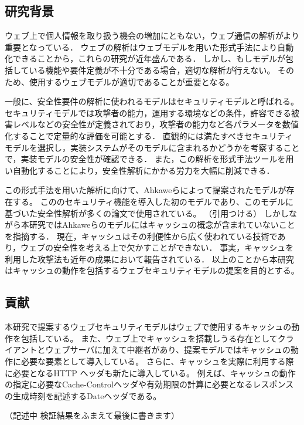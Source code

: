 \documentclass{css}
\begin{document}
\subsection{研究背景}
ウェブ上で個人情報を取り扱う機会の増加にともない，ウェブ通信の解析がより重要となっている．
\color{red}
ウェブの解析はウェブモデルを用いた形式手法により自動化できることから，これらの研究が近年盛んである．
\color{black}
しかし、もしモデルが包括している機能や要件定義が不十分である場合，適切な解析が行えない。
そのため、使用するウェブモデルが適切であることが重要となる。

一般に、安全性要件の解析に使われるモデルはセキュリティモデルと呼ばれる。
セキュリティモデルでは攻撃者の能力，運用する環境などの条件，許容できる被害レベルなどの安全性が定義されており，攻撃者の能力など各パラメータを数値化することで定量的な評価を可能とする．
直観的には満たすべきセキュリティモデルを選択し，実装システムがそのモデルに含まれるかどうかを考察することで，実装モデルの安全性が確認できる．
また，この解析を形式手法ツールを用い自動化することにより，安全性解析にかかる労力を大幅に削減できる．

\color{red}
この形式手法を用いた解析に向けて、Ahkaweらによって提案されたモデルが存在する\cite{webmodel}。
こののセキュリティ機能を導入した初のモデルであり、このモデルに基づいた安全性解析が多くの論文で使用されている。
\color{black}
\color{red}
（引用つける）
\color{black}
しかしながら本研究ではAhkaweらのモデルにはキャッシュの概念が含まれていないことを指摘する．
現在，キャッシュはその利便性から広く使われている技術であり，ウェブの安全性を考える上で欠かすことができない．
事実，キャッシュを利用した攻撃法も近年の成果において報告されている\cite{bcpattack}．
以上のことから本研究はキャッシュの動作を包括するウェブセキュリティモデルの提案を目的とする。

\subsection{貢献}
本研究で提案するウェブセキュリティモデルはウェブで使用するキャッシュの動作を包括している。
また、ウェブ上でキャッシュを搭載しうる存在としてクライアントとウェブサーバに加えて中継者があり、提案モデルではキャッシュの動作に必要な要素として導入している。
さらに、キャッシュを実際に利用する際に必要となるHTTP ヘッダも新たに導入している。
例えば、キャッシュの動作の指定に必要なCache-Controlヘッダや有効期限の計算に必要となるレスポンスの生成時刻を記述するDateヘッダである。

\color{red}
（記述中 検証結果をふまえて最後に書きます）
\color{black}
\end{document}
